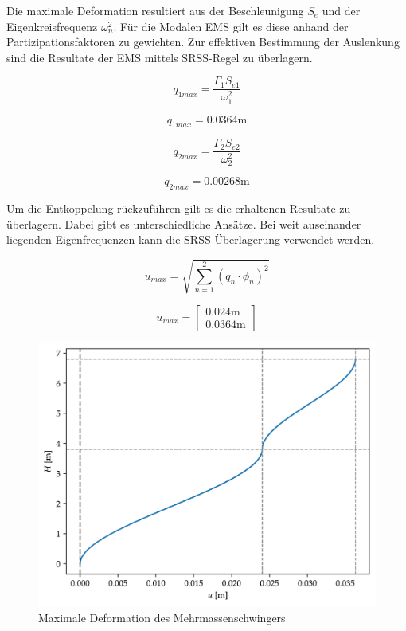 \documentclass[
  letterpaper,
  DIV=11]{scrreprt}
\begin{document}
Die maximale Deformation resultiert aus der Beschleunigung \(S_e\) und
der Eigenkreisfrequenz \(\omega_n^2\). Für die Modalen EMS gilt es diese
anhand der Partizipationsfaktoren zu gewichten. Zur effektiven
Bestimmung der Auslenkung sind die Resultate der EMS mittels SRSS-Regel
zu überlagern.

\begin{equation*}q_{1 max} = \frac{\Gamma_{1} S_{e 1}}{\omega_{1}^{2}}\end{equation*}

\begin{equation*}q_{1 max} = 0.0364 \text{m}\end{equation*}

\begin{equation*}q_{2 max} = \frac{\Gamma_{2} S_{e 2}}{\omega_{2}^{2}}\end{equation*}

\begin{equation*}q_{2 max} = 0.00268 \text{m}\end{equation*}

Um die Entkoppelung rückzuführen gilt es die erhaltenen Resultate zu
überlagern. Dabei gibt es unterschiedliche Ansätze. Bei weit auseinander
liegenden Eigenfrequenzen kann die SRSS-Überlagerung verwendet werden.

\[u_{max} = \sqrt{\sum_{n=1}^2 (q_{n} \cdot \phi_n)^2}\]

\begin{equation*}u_{max} = \left[\begin{matrix}0.024 \text{m}\\0.0364 \text{m}\end{matrix}\right]\end{equation*}

\begin{figure}[H]

{\centering \includegraphics{index_files/mediabag/mms_06_files/figure-pdf/fig-deformation-output-1.pdf}

}

\caption{\label{fig-deformation}Maximale Deformation des
Mehrmassenschwingers}

\end{figure}
\end{document}
